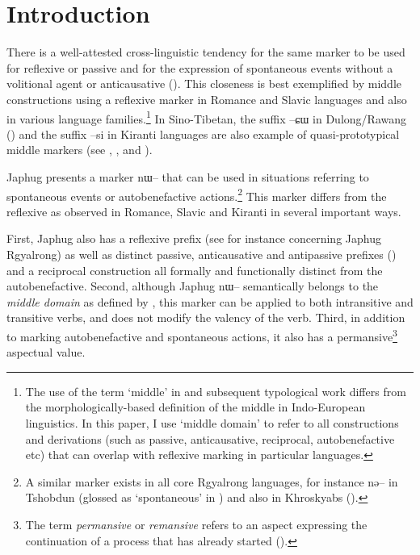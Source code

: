 \documentclass[oldfontcommands,oneside,a4paper,11pt]{article}
\newcommand{\ipa}[1]{{\phon \mbox{#1}}} %
\begin{document}
\section{Introduction}
There is a well-attested cross-linguistic tendency for the same marker to be used for reflexive or passive and for the expression of spontaneous events without a volitional agent or anticausative (\citealt[142-144]{kemmer93middle}). This closeness is best exemplified by middle constructions using a reflexive marker  in Romance and Slavic languages and also in various language families.\footnote{The use of the term `middle' in \citet{kemmer93middle}  and subsequent typological work differs from the morphologically-based definition of the middle in Indo-European linguistics.    In this paper, I use `middle domain' to refer to all constructions and derivations (such as passive, anticausative, reciprocal, autobenefactive etc) that can overlap with reflexive marking in particular languages. } In Sino-Tibetan, the suffix \ipa{--ɕɯ}  in Dulong/Rawang (\citealt{lapolla05reflexive}) and the suffix \ipa{--si}  in Kiranti languages are also example of quasi-prototypical middle markers (see \citealt[144-146]{michailovsky88}, \citealt[125-129]{driem93dumi}, \citealt[260-263]{opgenort04wambule} and \citealt[398]{bickel10ditransitive}).

Japhug presents a marker \ipa{nɯ--} that can be used in situations referring to  spontaneous events or autobenefactive actions.\footnote{A similar marker exists in all core Rgyalrong languages, for instance \ipa{nə--} in Tshobdun (glossed as `spontaneous' in \citealt[634]{jackson14morpho}) and also in Khroskyabs (\citealt[157-160]{lai13affixale}).} This marker differs from the reflexive as observed in Romance, Slavic and Kiranti in several important ways.

First, Japhug also has a  reflexive prefix (see for instance \citealt{jacques10refl} concerning Japhug Rgyalrong) as well as distinct passive, anticausative and antipassive prefixes (\citealt{jacques12demotion}) and a reciprocal construction all formally and functionally distinct from the autobenefactive. Second, although Japhug  \ipa{nɯ--}  semantically belongs to the \textit{middle domain} as defined by \citet[15]{kemmer93middle}, this marker can be applied to both intransitive and transitive verbs,  and does not modify the valency of the verb.  Third, in addition to marking autobenefactive and spontaneous actions, it also has a permansive\footnote{The term \textit{permansive} or \textit{remansive} refers to an aspect expressing the continuation of a process that has already started (\citealt[130]{francois03predicat}).} aspectual value.
 
\end{document}
